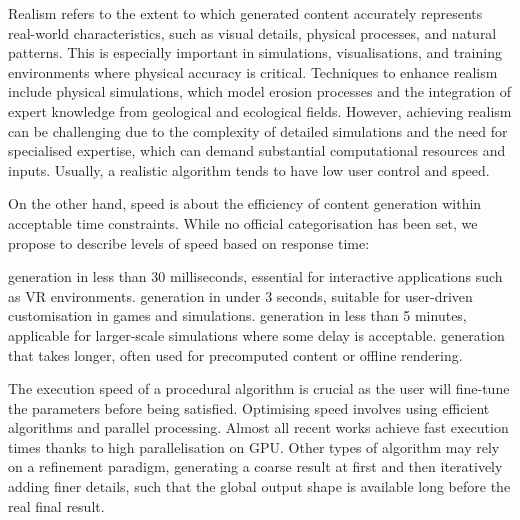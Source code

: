
Realism refers to the extent to which generated content accurately represents real-world characteristics, such as visual details, physical processes, and natural patterns. This is especially important in simulations, visualisations, and training environments where physical accuracy is critical. Techniques to enhance realism include physical simulations, which model erosion processes and the integration of expert knowledge from geological and ecological fields. However, achieving realism can be challenging due to the complexity of detailed simulations and the need for specialised expertise, which can demand substantial computational resources and inputs. Usually, a realistic algorithm tends to have low user control and speed.

On the other hand, speed is about the efficiency of content generation within acceptable time constraints. While no official categorisation has been set, we propose to describe levels of speed based on response time:
\begin{Itemize}
     generation in less than 30 milliseconds, essential for interactive applications such as VR environments.
     generation in under 3 seconds, suitable for user-driven customisation in games and simulations.
     generation in less than 5 minutes, applicable for larger-scale simulations where some delay is acceptable.
     generation that takes longer, often used for precomputed content or offline rendering.
\end{Itemize}

The execution speed of a procedural algorithm is crucial as the user will fine-tune the parameters before being satisfied.
Optimising speed involves using efficient algorithms and parallel processing. Almost all recent works achieve fast execution times thanks to high parallelisation on GPU. Other types of algorithm may rely on a refinement paradigm, generating a coarse result at first and then iteratively adding finer details, such that the global output shape is available long before the real final result.


